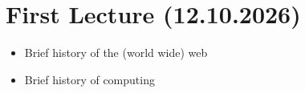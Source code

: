 \chapter{First Lecture (12.10.2026)}

\begin{itemize}
    \item Brief history of the (world wide) web
    \item Brief history of computing
\end{itemize}